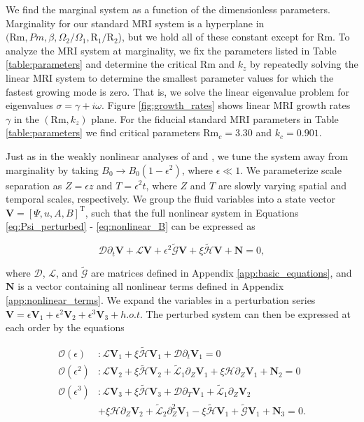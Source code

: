 \documentclass{emulateapj}
\newcommand{\beq}{\begin{equation}}
\newcommand{\eeq}{\end{equation}}
\newcommand{\citei}[1]{\citeauthor{#1} \citeyear{#1}}
\newcommand\reym{\mathrm{Rm}}
\begin{document}
We find the marginal system as a function of the dimensionless parameters. Marginality for our standard MRI system is a hyperplane in $(\reym, Pm, \beta, \Omega_2/\Omega_1, \mathrm{R}_1/\mathrm{R}_2$), but we hold all of these constant except for $\reym$. To analyze the MRI system at marginality, we fix the parameters listed in Table \ref{table:parameters} and determine the critical $\reym$ and $k_z$ by repeatedly solving the linear MRI system to determine the smallest parameter values for which the fastest growing mode is zero. That is, we solve the linear eigenvalue problem for eigenvalues $\sigma = \gamma + i \omega$. Figure \ref{fig:growth_rates} shows linear MRI growth rates $\gamma$ in the $(\reym, k_z)$ plane. For the fiducial standard MRI parameters in Table \ref{table:parameters} we find critical parameters $\reym_c = 3.30$ and $k_c = 0.901$.

Just as in the weakly nonlinear analyses of \citei{Umurhan:2007hs} and \citei{Clark:2016}, we tune the system away from marginality by taking $B_0 \rightarrow B_0\left(1 - \epsilon^2\right)$, where $\epsilon \ll 1$. We parameterize scale separation as $Z = \epsilon z$ and $T = \epsilon^2 t$, where $Z$ and $T$ are slowly varying spatial and temporal scales, respectively. We group the fluid variables into a state vector $\mathbf{V} = \left[\Psi, u, A, B\right]^{\mathrm{T}}$, such that the full nonlinear system in Equations \ref{eq:Psi_perturbed} - \ref{eq:nonlinear_B} can be expressed as

\beq\label{eq:unperturbed_matrix_eqns}
\mathcal{D}\partial_t\mathbf{V} + \mathcal{L}\mathbf{V} + \epsilon^2 \widetilde{\mathcal{G}} \mathbf{V} + \xi \widetilde{\mathcal{H}} \mathbf{V} +  \mathbf{N} = 0,
\eeq

where $\mathcal{D}$, $\mathcal{L}$, and $\widetilde{\mathcal{G}}$ are matrices defined in Appendix \ref{app:basic_equations}, and $\mathbf{N}$ is a vector containing all nonlinear terms defined in Appendix \ref{app:nonlinear_terms}. We expand the variables in a perturbation series $\mathbf{V} = \epsilon \mathbf{V}_1 + \epsilon^2 \mathbf{V}_2 + \epsilon^3 \mathbf{V}_3 + h.o.t.$ The perturbed system can then be expressed at each order by the equations

\begin{align}
\mathcal{O}(\epsilon)&: \mathcal{L} \mathbf{V}_1 + \xi \widetilde{\mathcal{H}} \mathbf{V}_1 + \mathcal{D} \partial_t \mathbf{V}_1 = 0 \label{eq:ordere}\\
\mathcal{O}(\epsilon^2)&: \mathcal{L} \mathbf{V}_2 + \xi \widetilde{\mathcal{H}} \mathbf{V}_2 + \widetilde{\mathcal{L}}_1 \partial_Z \mathbf{V}_1 + \xi \mathcal{H} \partial_Z \mathbf{V}_1 + \mathbf{N}_2 = 0 \\\label{eq:ordere2}
\mathcal{O}(\epsilon^3)&: \mathcal{L}\mathbf{V}_3 + \xi \widetilde{\mathcal{H}} \mathbf{V}_3 + \mathcal{D} \partial_T \mathbf{V}_1 + \widetilde{\mathcal{L}}_1 \partial_Z \mathbf{V}_2\nonumber \\ 
&+ \xi \mathcal{H}\partial_Z \mathbf{V}_2 + \widetilde{\mathcal{L}}_2 \partial_Z^2 \mathbf{V}_1 - \xi \widetilde{\mathcal{H}} \mathbf{V}_1 + \widetilde{\mathcal{G}} \mathbf{V}_1 + \mathbf{N}_3 = 0. \\\label{eq:ordere3}
\end{align}
\end{document}

